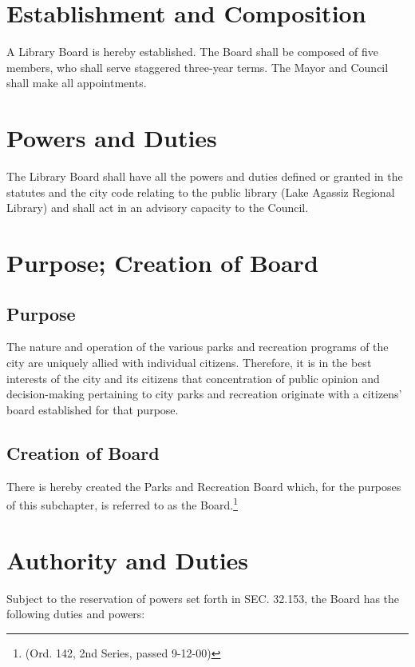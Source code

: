 \setcounter{section}{139}
\section{Establishment and Composition}
A Library Board is hereby established. The Board shall be composed of five members, who shall serve staggered three-year terms. The Mayor and Council shall make all appointments.

\section{Powers and Duties}
The Library Board shall have all the powers and duties defined or granted in the statutes and the city code relating to the public library (Lake Agassiz Regional Library) and shall act in an advisory capacity to the Council.\\

\setcounter{section}{149}
\section{Purpose; Creation of Board}
\subsection{Purpose}
The nature and operation of the various parks and recreation programs of the city are uniquely allied with individual citizens. Therefore, it is in the best interests of the city and its citizens that concentration of public opinion and decision-making pertaining to city parks and recreation originate with a citizens’ board established for that purpose.
\subsection{Creation of Board}
There is hereby created the Parks and Recreation Board which, for the purposes of this subchapter, is referred to as the Board.\footnote{(Ord. 142, 2nd Series, passed 9-12-00)}

\section{Authority and Duties}
Subject to the reservation of powers set forth in SEC. 32.153, the Board has the following duties and powers:
